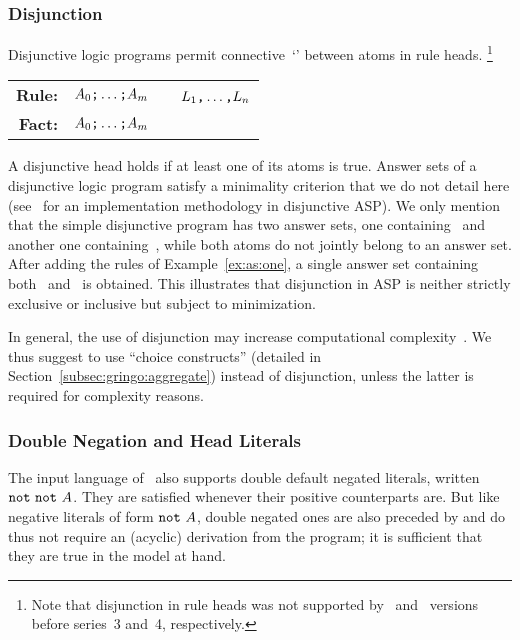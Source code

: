 \subsubsection{Disjunction}\label{subsec:gringo:disjunction}
Disjunctive logic programs permit connective~`\code{;}' between atoms in rule heads.%
\footnote{Note that disjunction in rule heads was not supported by \clasp\ and \clingo\ versions before series~3 and~4, respectively.}
\par
\medskip
\begin{tabular}{rl@{}l}\label{eq:disjunctive:rule}
\textbf{Rule:} & $A_0\text{\texttt{;}}\dots\text{\texttt{;}}A_m$&~\code{:-}~$L_1\text{\texttt{,}}\dots\text{\texttt{,}}L_n$\code{.}
\\
\textbf{Fact:} & $A_0\text{\texttt{;}}\dots\text{\texttt{;}}A_m$&\code{.}
\end{tabular}
%
%
\par
\medskip
\noindent
A disjunctive head holds if at least one of its atoms is true.
Answer sets of a disjunctive logic program satisfy a minimality criterion
that we do not detail here
(see~\cite{eitpol06a,gekasc11b} for an implementation methodology in disjunctive ASP).
We only mention that the simple disjunctive program  has two answer sets,
one containing~ and another one containing~,
while both atoms do not jointly belong to an answer set.
After adding the rules of Example~\ref{ex:as:one}, a single answer set containing both~ and~ is obtained.
This illustrates that disjunction in ASP is neither strictly exclusive or inclusive but subject to minimization.

In general, the use of disjunction may increase
computational complexity~\cite{eitgot95a}.
We thus suggest to use ``choice constructs'' (detailed in Section~\ref{subsec:gringo:aggregate})
instead of disjunction, unless the latter is required for complexity reasons.

\subsubsection{Double Negation and Head Literals}\label{subsec:gringo:double}

The input language of \gringo\ also supports double default negated literals,
written $\texttt{not}~\texttt{not}~A$.
They are satisfied whenever their positive counterparts are.
But like negative literals of form $\texttt{not}~A$,
double negated ones are also preceded by  and 
do thus not require an (acyclic) derivation from the program;
it is sufficient that they are true in the model at hand.

